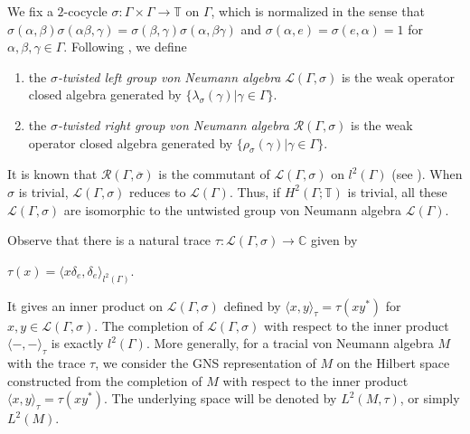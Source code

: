 \documentclass[11pt]{article}
\theoremstyle{plain}
\theoremstyle{remark}
\theoremstyle{definition}
\begin{document}
We fix a $2$-cocycle $\sigma\colon \Gamma\times \Gamma \to \mathbb{T}$ on $\Gamma$, which is normalized in the sense that $\sigma(\alpha,\beta)\sigma(\alpha\beta,\gamma)=\sigma(\beta,\gamma)\sigma(\alpha,\beta\gamma)$ and $\sigma(\alpha,e)=\sigma(e,\alpha)=1$ for $\alpha,\beta,\gamma\in \Gamma$. 
Following \cite{VaDo2024,Enstad22}, we define
\begin{enumerate}
\item the {\it $\sigma$-twisted left group von Neumann algebra} $\mathcal{L}(\Gamma,\sigma)$ is the weak operator closed algebra generated by $\{\lambda_{\sigma}(\gamma)|\gamma\in \Gamma\}$.
    \item the {\it $\sigma$-twisted right group von Neumann algebra} $\mathcal{R}(\Gamma,\sigma)$ is the weak operator closed algebra generated by $\{\rho_{\sigma}(\gamma)|\gamma\in \Gamma\}$. 
\end{enumerate}
It is known that $\mathcal{R}(\Gamma,\overline{\sigma})$ is the commutant of $\mathcal{L}(\Gamma,\sigma)$ on $l^2(\Gamma)$  (see \cite[\S 1]{Kleppner62}). 
When $\sigma$ is trivial, $\mathcal{L}(\Gamma,\sigma)$ reduces to $\mathcal{L}(\Gamma)$. 
Thus, if $H^2(\Gamma;\mathbb{T})$ is trivial, all these $\mathcal{L}(\Gamma,\sigma)$ are isomorphic to the untwisted group von Neumann algebra $\mathcal{L}(\Gamma)$. 


Observe that there is a natural trace $\tau\colon \mathcal{L}(\Gamma,\sigma)\to \mathbb{C}$  given by
\begin{center}
    $\tau(x)=\langle x\delta_e,\delta_e\rangle_{l^2(\Gamma)}$.
\end{center}
It gives an inner product on $\mathcal{L}(\Gamma,\sigma)$ defined by $\langle x,y \rangle_{\tau}=\tau(xy^*)$ for $x,y\in \mathcal{L}(\Gamma,\sigma)$. 
The completion of $\mathcal{L}(\Gamma,\sigma)$ with respect to the inner product $\langle -,- \rangle_{\tau}$ is exactly $l^2(\Gamma)$. 
More generally, for a tracial von Neumann algebra $M$ with the trace $\tau$, we consider the GNS representation of $M$ on the Hilbert space constructed from the completion of $M$ with respect to the inner product $\langle x,y\rangle_{\tau}=\tau(xy^*)$. 
The underlying space will be denoted by $L^2(M,\tau)$, or simply $L^2(M)$.
 
\end{document}

